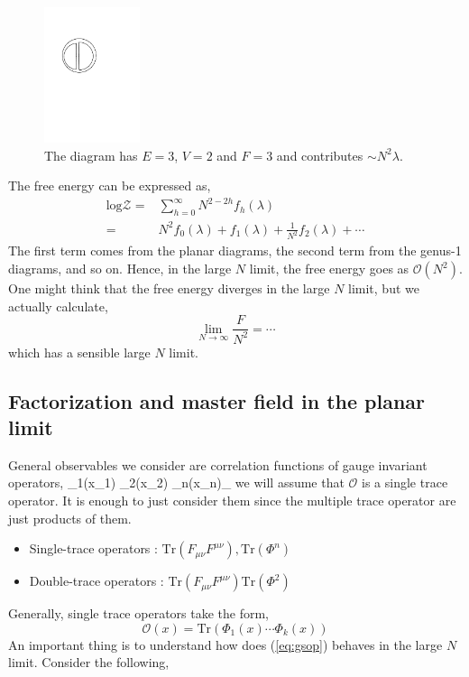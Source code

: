 \begin{figure}
\begin{center}\includegraphics[width=0.25\textwidth]{./Figures/DL4}\end{center}
\caption{\label{fig:dl99}The diagram has $E=3$, $V=2$ and $F=3$ and contributes $\sim N^2 \lambda $.}
\end{figure}
The free energy can be expressed as, 
\begin{align}
  \label{eq:logZ}
   \text{log} \mathscr{Z} =&\sum_{h=0}^{\infty} N^{2-2h} f_{h}(\lambda) \\ 
   				    =& N^{2} f_{0}(\lambda) + f_{1}(\lambda) + \frac{1}{N^2} f_{2}(\lambda) + \cdots
\end{align}
The first term comes from the planar diagrams, the second term from the genus-1 diagrams, and so on.
Hence, in the large $N$ limit, the free energy goes as $\mathscr{O}(N^2)$. 
One might think that the free energy diverges in the large $N$ limit, but we actually calculate, 
\[ \displaystyle\lim_{N \to \infty} \frac{F}{N^2} = \cdots  \] 
which has a sensible large $N$ limit. 

\subsection{Factorization and master field in the planar limit}
General observables we consider are correlation functions of gauge invariant operators, 
\beq
 \label{eq:gsop}
\langle {}_{1}(x_{1}) _{2}(x_{2}) \cdots {}_{n}(x_{n})\rangle_{}
\eeq 
we will assume that $\mathcal{O}$ is a single trace operator. It is enough to just consider 
them since the multiple trace operator are just products of them. 
\begin{itemize}
\item Single-trace operators : $\mathrm{Tr}(F_{\mu\nu}F^{\mu\nu}) , \mathrm{Tr}(\Phi^n)$ 
\item Double-trace operators : $\mathrm{Tr}(F_{\mu\nu}F^{\mu\nu})\mathrm{Tr}(\Phi^2)$ 
\end{itemize}
Generally, single trace operators take the form, 
\begin{equation}
 \mathcal{O}(x)  = \mathrm{Tr} (\Phi_{1}(x) \cdots \Phi_{k}(x)) 
 \end{equation}
An important thing is to understand how does (\ref{eq:gsop}) behaves in the large $N$ limit. 
Consider the following, 


